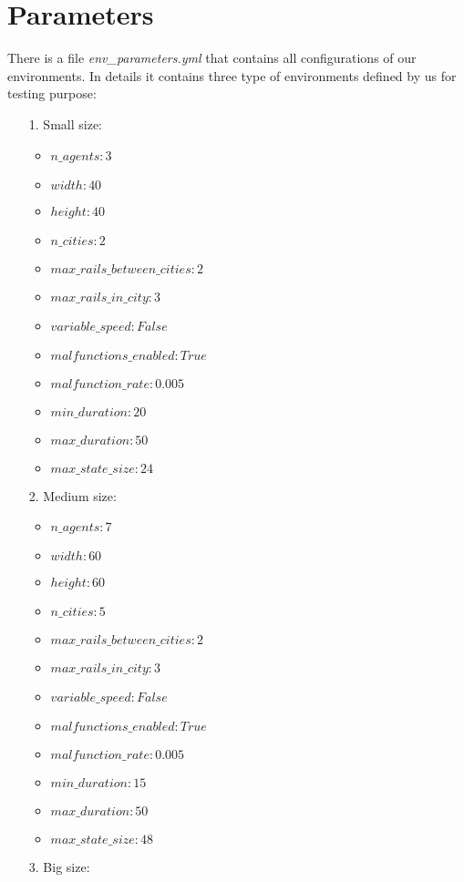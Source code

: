 \section{Parameters}
\label{sec:ourParameters}
There is a file \textit{env\_parameters.yml} that contains all configurations of our environments. In details it contains three type of environments defined by us for testing purpose:
\begin{enumerate}
	\item [1.] Small size:
	\begin{itemize}
		\item $n\_agents: 3$
		\item $width: 40$
		\item $height: 40$
		\item $n\_cities: 2$
		\item $max\_rails\_between\_cities: 2$
		\item $max\_rails\_in\_city: 3$
		\item  $variable\_speed: False$
		\item $malfunctions\_enabled: True$
		\item $malfunction\_rate: 0.005$
		\item $min\_duration: 20$
		\item $max\_duration: 50$
		\item $max\_state\_size: 24$
	\end{itemize}
	\item [2.] Medium size:
		\begin{itemize}
		\item $n\_agents: 7 $
		\item $width: 60 $
		\item $height: 60 $
		\item $n\_cities: 5 $
		\item $max\_rails\_between\_cities: 2 $
		\item $max\_rails\_in\_city: 3 $
		\item  $variable\_speed: False $
		\item $malfunctions\_enabled: True $
		\item $malfunction\_rate: 0.005 $
		\item $min\_duration: 15 $
		\item $max\_duration: 50 $
		\item $max\_state\_size: 48$
	\end{itemize}
	\item [3.] Big size:
		\begin{itemize}

\end{itemize}
\end{enumerate}
